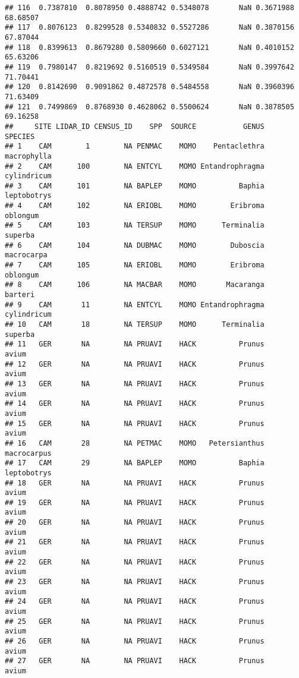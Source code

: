 \documentclass[]{article}
\begin{document}
\begin{verbatim}
## 116  0.7387810  0.8078950 0.4888742 0.5348078       NaN 0.3671988     68.68507
## 117  0.8076123  0.8299528 0.5340832 0.5527286       NaN 0.3870156     67.87044
## 118  0.8399613  0.8679280 0.5809660 0.6027121       NaN 0.4010152     65.63206
## 119  0.7980147  0.8219692 0.5160519 0.5349584       NaN 0.3997642     71.70441
## 120  0.8142690  0.9091862 0.4872578 0.5484558       NaN 0.3960396     71.63409
## 121  0.7499869  0.8768930 0.4628062 0.5500624       NaN 0.3878505     69.16258
##     SITE LIDAR_ID CENSUS_ID    SPP  SOURCE           GENUS        SPECIES
## 1    CAM        1        NA PENMAC    MOMO    Pentaclethra    macrophylla
## 2    CAM      100        NA ENTCYL    MOMO Entandrophragma    cylindricum
## 3    CAM      101        NA BAPLEP    MOMO          Baphia    leptobotrys
## 4    CAM      102        NA ERIOBL    MOMO        Eribroma       oblongum
## 5    CAM      103        NA TERSUP    MOMO      Terminalia        superba
## 6    CAM      104        NA DUBMAC    MOMO        Duboscia     macrocarpa
## 7    CAM      105        NA ERIOBL    MOMO        Eribroma       oblongum
## 8    CAM      106        NA MACBAR    MOMO       Macaranga        barteri
## 9    CAM       11        NA ENTCYL    MOMO Entandrophragma    cylindricum
## 10   CAM       18        NA TERSUP    MOMO      Terminalia        superba
## 11   GER       NA        NA PRUAVI    HACK          Prunus          avium
## 12   GER       NA        NA PRUAVI    HACK          Prunus          avium
## 13   GER       NA        NA PRUAVI    HACK          Prunus          avium
## 14   GER       NA        NA PRUAVI    HACK          Prunus          avium
## 15   GER       NA        NA PRUAVI    HACK          Prunus          avium
## 16   CAM       28        NA PETMAC    MOMO   Petersianthus    macrocarpus
## 17   CAM       29        NA BAPLEP    MOMO          Baphia    leptobotrys
## 18   GER       NA        NA PRUAVI    HACK          Prunus          avium
## 19   GER       NA        NA PRUAVI    HACK          Prunus          avium
## 20   GER       NA        NA PRUAVI    HACK          Prunus          avium
## 21   GER       NA        NA PRUAVI    HACK          Prunus          avium
## 22   GER       NA        NA PRUAVI    HACK          Prunus          avium
## 23   GER       NA        NA PRUAVI    HACK          Prunus          avium
## 24   GER       NA        NA PRUAVI    HACK          Prunus          avium
## 25   GER       NA        NA PRUAVI    HACK          Prunus          avium
## 26   GER       NA        NA PRUAVI    HACK          Prunus          avium
## 27   GER       NA        NA PRUAVI    HACK          Prunus          avium

\end{verbatim}
\end{document}
